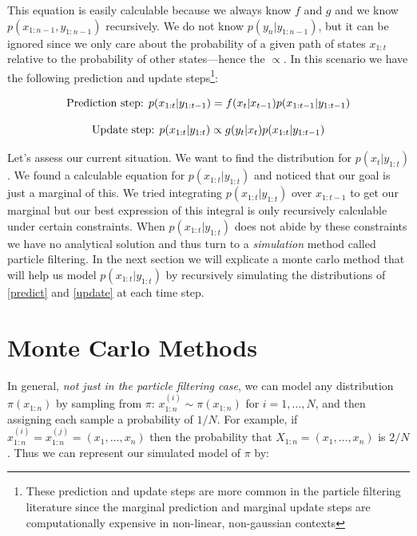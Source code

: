 \documentclass{article}
\begin{document}
\noindent
This equation is easily calculable because we always know $f$ and $g$ and we know $p(x_{1:n-1},y_{1:n-1})$ recursively. We do not know $p(y_n|y_{1:n-1})$, but it can be ignored since we only care about the probability of a given path of states $x_{1:t}$ relative to the probability of other states---hence the $\propto$. In this scenario we have the following prediction and update steps\footnote{These prediction and update steps are more common in the particle filtering literature since the marginal prediction and marginal update steps are computationally expensive in non-linear, non-gaussian contexts}:

\begin{equation} \label{predict}
\textnormal{Prediction step:  }
p(x_{1:t}|y_{1:t-1})= f(x_t|x_{t-1}) p(x_{1:t-1}|y_{1:t-1})
\end{equation}

\begin{equation} \label{update}
\textnormal{Update step:  }
p(x_{1:t}|y_{1:t})\propto g(y_t|x_t)p(x_{1:t}|y_{1:t-1})
\end{equation}

Let's assess our current situation. We want to find the distribution for $p(x_t|y_{1:t})$. We found a calculable equation for $p(x_{1:t}|y_{1:t})$ and noticed that our goal is just a marginal of this. We tried integrating $p(x_{1:t}|y_{1:t})$ over $x_{1:t-1}$ to get our marginal but our best expression of this integral is only recursively calculable under certain constraints. When $p(x_{1:t}|y_{1:t})$ does not abide by these constraints we have no analytical solution and thus turn to a \textit{simulation} method called particle filtering. In the next section we will explicate a monte carlo method that will help us model $p(x_{1:t}|y_{1:t})$ by recursively simulating the distributions of \eqref{predict} and \eqref{update} at each time step.

\section{Monte Carlo Methods}

In general, \textit{not just in the particle filtering case}, we can model any distribution $\pi(x_{1:n})$ by sampling from $\pi$: $x_{1:n}^{(i)} \sim \pi(x_{1:n})$ for $i=1,\dots,N$, and then assigning each sample a probability of $1/N$. For example, if $x_{1:n}^{(i)} = x_{1:n}^{(j)} = (x_1,\dots,x_n)$ then the probability that $X_{1:n} = (x_1,\dots,x_n)$ is $2/N$. Thus we can represent our simulated model of $\pi$ by:
\end{document}
